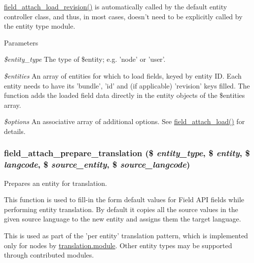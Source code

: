 \hyperlink{group__field__attach_gac79dd0f29910835c653b068233fa429b}{field\_\-attach\_\-load\_\-revision()} is automatically called by the default entity controller class, and thus, in most cases, doesn't need to be explicitly called by the entity type module.


\begin{DoxyParams}{Parameters}
\item[{\em \$entity\_\-type}]The type of \$entity; e.g. 'node' or 'user'. \item[{\em \$entities}]An array of entities for which to load fields, keyed by entity ID. Each entity needs to have its 'bundle', 'id' and (if applicable) 'revision' keys filled. The function adds the loaded field data directly in the entity objects of the \$entities array. \item[{\em \$options}]An associative array of additional options. See \hyperlink{group__field__attach_ga1e92543395961c912eb293b50e991586}{field\_\-attach\_\-load()} for details. \end{DoxyParams}
\hypertarget{group__field__attach_ga7ce84fbf2feb3e4b22bacbe6ed5ed103}{
\subsubsection[{field\_\-attach\_\-prepare\_\-translation}]{\setlength{\rightskip}{0pt plus 5cm}field\_\-attach\_\-prepare\_\-translation (\$ {\em entity\_\-type}, \/  \$ {\em entity}, \/  \$ {\em langcode}, \/  \$ {\em source\_\-entity}, \/  \$ {\em source\_\-langcode})}}
\label{group__field__attach_ga7ce84fbf2feb3e4b22bacbe6ed5ed103}
Prepares an entity for translation.

This function is used to fill-\/in the form default values for Field API fields while performing entity translation. By default it copies all the source values in the given source language to the new entity and assigns them the target language.

This is used as part of the 'per entity' translation pattern, which is implemented only for nodes by \hyperlink{translation_8module}{translation.module}. Other entity types may be supported through contributed modules.


